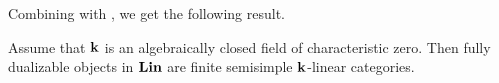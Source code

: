 Combining  with , we get
the following result.

\begin{theorem}\label{t:fd-linear}
   Assume that $\mathbf{k}$ is an algebraically closed field of characteristic zero.
   Then fully dualizable objects in $\mathbf{Lin}$ are finite semisimple
   $\mathbf{k}$-linear categories.
\end{theorem}




\clearpage
